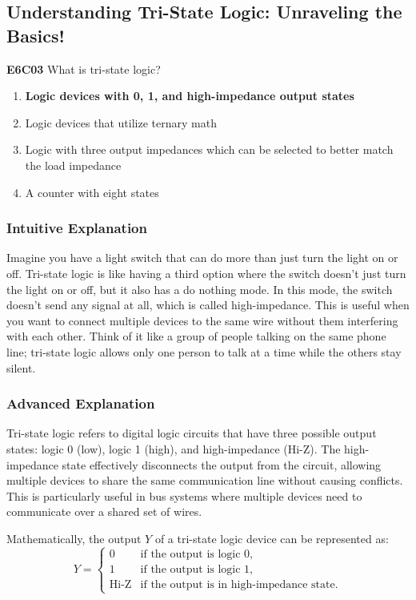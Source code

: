 \subsection{Understanding Tri-State Logic: Unraveling the Basics!}

\begin{tcolorbox}[colback=gray!10!white,colframe=black!75!black,title=E6C03]
\textbf{E6C03} What is tri-state logic?
\begin{enumerate}[label=\Alph*.]
    \item \textbf{Logic devices with 0, 1, and high-impedance output states}
    \item Logic devices that utilize ternary math
    \item Logic with three output impedances which can be selected to better match the load impedance
    \item A counter with eight states
\end{enumerate}
\end{tcolorbox}

\subsubsection{Intuitive Explanation}
Imagine you have a light switch that can do more than just turn the light on or off. Tri-state logic is like having a third option where the switch doesn't just turn the light on or off, but it also has a do nothing mode. In this mode, the switch doesn't send any signal at all, which is called high-impedance. This is useful when you want to connect multiple devices to the same wire without them interfering with each other. Think of it like a group of people talking on the same phone line; tri-state logic allows only one person to talk at a time while the others stay silent.

\subsubsection{Advanced Explanation}
Tri-state logic refers to digital logic circuits that have three possible output states: logic 0 (low), logic 1 (high), and high-impedance (Hi-Z). The high-impedance state effectively disconnects the output from the circuit, allowing multiple devices to share the same communication line without causing conflicts. This is particularly useful in bus systems where multiple devices need to communicate over a shared set of wires.

Mathematically, the output \( Y \) of a tri-state logic device can be represented as:
\[
Y = \begin{cases}
0 & \text{if the output is logic 0}, \\
1 & \text{if the output is logic 1}, \\
\text{Hi-Z} & \text{if the output is in high-impedance state}.
\end{cases}
\]

